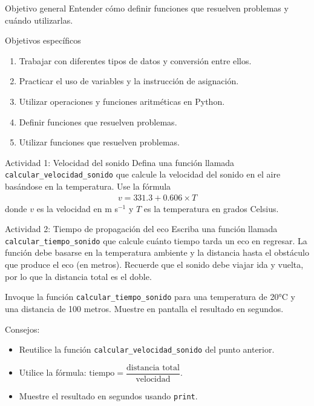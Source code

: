 \documentclass{ip-lab}
\begin{document}
\maketitle

\begin{sectionbox}{Objetivo general}
Entender cómo definir funciones que resuelven problemas y cuándo utilizarlas.
\end{sectionbox}

\begin{sectionbox}{Objetivos específicos}
\begin{enumerate}
    \item Trabajar con diferentes tipos de datos y conversión entre ellos.
    \item Practicar el uso de variables y la instrucción de asignación.
    \item Utilizar operaciones y funciones aritméticas en Python.
    \item Definir funciones que resuelven problemas.
    \item Utilizar funciones que resuelven problemas.
\end{enumerate}
\end{sectionbox}

\begin{sectionbox}{Actividad 1: Velocidad del sonido}
Defina una función llamada \texttt{calcular\_velocidad\_sonido} que calcule la velocidad del sonido en el aire basándose en la temperatura. Use la fórmula
\begin{gather*}
    v = 331.3 + 0.606 \times T
\end{gather*}
donde $v$ es la velocidad en m s$^{-1}$ y $T$ es la temperatura en grados Celsius.
\end{sectionbox}

\begin{sectionbox}{Actividad 2: Tiempo de propagación del eco}
Escriba una función llamada \texttt{calcular\_tiempo\_sonido} que calcule cuánto tiempo tarda un eco en regresar. La función debe basarse en la temperatura ambiente y la distancia hasta el obstáculo que produce el eco (en metros). Recuerde que el sonido debe viajar ida y vuelta, por lo que la distancia total es el doble. 
\pagebreak

Invoque la función \texttt{calcular\_tiempo\_sonido} para una temperatura de 20°C y una distancia de 100 metros. Muestre en pantalla el resultado en segundos.

Consejos:
\begin{itemize}
    \item Reutilice la función \texttt{calcular\_velocidad\_sonido} del punto anterior.
    \item Utilice la fórmula: $\text{tiempo} = \dfrac{\text{distancia total}}{\text{velocidad}}$.
    \item Muestre el resultado en segundos usando \texttt{print}.
\end{itemize}
\end{sectionbox}
\end{document}
